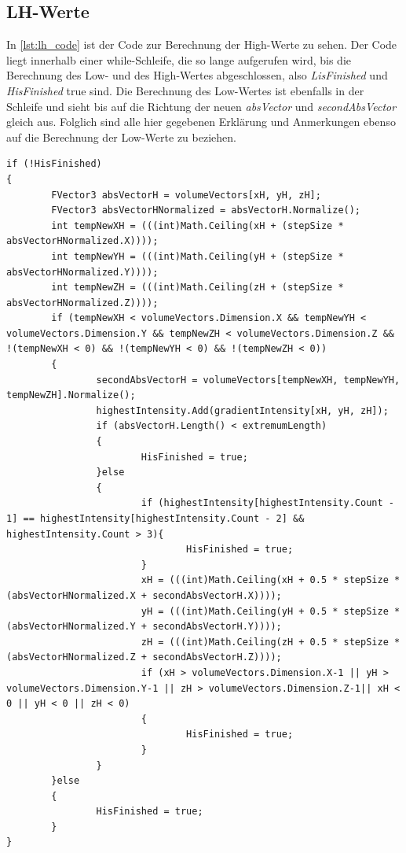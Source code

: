 \subsection{LH-Werte}

In \autoref{lst:lh_code} ist der Code zur Berechnung der High-Werte zu sehen. Der Code liegt innerhalb einer while-Schleife, die so lange aufgerufen wird, bis die Berechnung des Low- und des High-Wertes abgeschlossen, also \textit{LisFinished} und \textit{HisFinished} true sind.
\newline
Die Berechnung des Low-Wertes ist ebenfalls in der Schleife und sieht bis auf die Richtung der neuen \textit{absVector} und \textit{secondAbsVector} gleich aus. Folglich sind alle hier gegebenen Erklärung und Anmerkungen ebenso auf die Berechnung der Low-Werte zu beziehen.




\begin{lstlisting}[caption = Code zur Berechnung der High-Werte, label = lst:lh_code]
if (!HisFinished)
{
		FVector3 absVectorH = volumeVectors[xH, yH, zH];
		FVector3 absVectorHNormalized = absVectorH.Normalize();
		int tempNewXH = (((int)Math.Ceiling(xH + (stepSize * absVectorHNormalized.X))));
		int tempNewYH = (((int)Math.Ceiling(yH + (stepSize * absVectorHNormalized.Y))));
		int tempNewZH = (((int)Math.Ceiling(zH + (stepSize * absVectorHNormalized.Z))));
		if (tempNewXH < volumeVectors.Dimension.X && tempNewYH < volumeVectors.Dimension.Y && tempNewZH < volumeVectors.Dimension.Z && !(tempNewXH < 0) && !(tempNewYH < 0) && !(tempNewZH < 0))
		{
				secondAbsVectorH = volumeVectors[tempNewXH, tempNewYH, tempNewZH].Normalize();
				highestIntensity.Add(gradientIntensity[xH, yH, zH]);
				if (absVectorH.Length() < extremumLength)
				{
						HisFinished = true;
				}else
				{
						if (highestIntensity[highestIntensity.Count - 1] == highestIntensity[highestIntensity.Count - 2] && highestIntensity.Count > 3){
								HisFinished = true;
						}
						xH = (((int)Math.Ceiling(xH + 0.5 * stepSize * (absVectorHNormalized.X + secondAbsVectorH.X))));
						yH = (((int)Math.Ceiling(yH + 0.5 * stepSize * (absVectorHNormalized.Y + secondAbsVectorH.Y))));
						zH = (((int)Math.Ceiling(zH + 0.5 * stepSize * (absVectorHNormalized.Z + secondAbsVectorH.Z))));
						if (xH > volumeVectors.Dimension.X-1 || yH > volumeVectors.Dimension.Y-1 || zH > volumeVectors.Dimension.Z-1|| xH < 0 || yH < 0 || zH < 0)
						{
								HisFinished = true;
						}
				}
		}else
		{
				HisFinished = true;
		}
}
\end{lstlisting}



